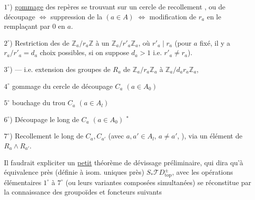 
$1^\circ$) \uline{gommage}  des repères se trouvant sur un cercle de recollement , ou  de découpage
$\Longleftrightarrow$ suppression de la  
$(a\in A)$ $\Longleftrightarrow$ modification de $r_a$ en le
remplaçant par $0$ en $a$.

$2^\circ$) 
Restriction des   de $\mathbb Z_a/r_a\mathbb Z$ à un
$\mathbb Z_a/r'_a\mathbb Z_a$, où $r'_a\mid r_a$
(pour $a$ fixé, il y a $r_a/r'_a=d_a$ choix possibles, si on suppose $d_a>1$ i.e. $r'_a\ne r_a$).

$3^\circ$) 
--- i.e. extension des groupes de $R_a$ de
$\mathbb Z_a/r_a\mathbb Z_a$ à $\mathbb Z_a/d_ar_a\mathbb Z_a$,

\textcircled{$4^\circ$} gommage du cercle de découpage $C_a$ $(a\in A_0)$

\textcircled{$5^\circ$} bouchage du trou $C_a$ $(a\in A_l)$

$6^\circ$) Découpage le long de $C_a$ $(a\in A_0)$ \({}^*\)

$7^\circ$) Recollement le long de $C_a,C_{a'}$
(avec $a,a'\in A_l$, $a\ne a'$, ), via un élément de
$R_a\mathbin{\wedge}R_{a'}$.


Il faudrait expliciter un \uline{petit} théorème de dévissage préliminaire, qui dira qu'à équivalence près (définie à isom. uniques près)
$S_*\mathcal TD_{\mathrm{top}}^\pm$,
avec les opérations élémentaires $1^\circ$ à $7^\circ$ (ou leurs variantes composées simultanées) se réconstitue par la connaissance des groupoïdes et foncteurs suivants

